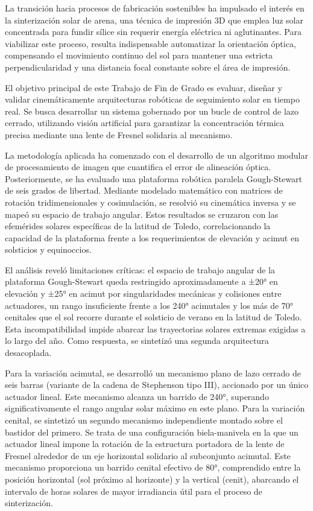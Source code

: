 \begin{resumen}
La transición hacia procesos de fabricación sostenibles ha impulsado el interés en la sinterización solar de arena, una técnica de impresión 3D que emplea luz solar concentrada para fundir sílice sin requerir energía eléctrica ni aglutinantes. Para viabilizar este proceso, resulta indispensable automatizar la orientación óptica, compensando el movimiento continuo del sol para mantener una estricta perpendicularidad y una distancia focal constante sobre el área de impresión.

El objetivo principal de este Trabajo de Fin de Grado es evaluar, diseñar y validar cinemáticamente arquitecturas robóticas de seguimiento solar en tiempo real. Se busca desarrollar un sistema gobernado por un bucle de control de lazo cerrado, utilizando visión artificial para garantizar la concentración térmica precisa mediante una lente de Fresnel solidaria al mecanismo.

La metodología aplicada ha comenzado con el desarrollo de un algoritmo modular de procesamiento de imagen que cuantifica el error de alineación óptica. Posteriormente, se ha evaluado una plataforma robótica paralela Gough-Stewart de seis grados de libertad. Mediante modelado matemático con matrices de rotación tridimensionales y cosimulación, se resolvió su cinemática inversa y se mapeó su espacio de trabajo angular. Estos resultados se cruzaron con las efemérides solares específicas de la latitud de Toledo, correlacionando la capacidad de la plataforma frente a los requerimientos de elevación y acimut en solsticios y equinoccios.

El análisis reveló limitaciones críticas: el espacio de trabajo angular de la plataforma Gough-Stewart queda restringido aproximadamente a ±20° en elevación y ±25° en acimut por singularidades mecánicas y colisiones entre actuadores, un rango insuficiente frente a los 240° acimutales y los más de 70° cenitales que el sol recorre durante el solsticio de verano en la latitud de Toledo. Esta incompatibilidad impide abarcar las trayectorias solares extremas exigidas a lo largo del año. Como respuesta, se sintetizó una segunda arquitectura desacoplada. 

Para la variación acimutal, se desarrolló un mecanismo plano de lazo cerrado de seis barras (variante de la cadena de Stephenson tipo III), accionado por un único actuador lineal. Este mecanismo alcanza un barrido de 240°, superando significativamente el rango angular solar máximo en este plano. Para la variación cenital, se sintetizó un segundo mecanismo independiente montado sobre el bastidor del primero. Se trata de una configuración biela-manivela en la que un actuador lineal impone la rotación de la estructura portadora de la lente de Fresnel alrededor de un eje horizontal solidario al subconjunto acimutal. Este mecanismo proporciona un barrido cenital efectivo de 80°, comprendido entre la posición horizontal (sol próximo al horizonte) y la vertical (cenit), abarcando el intervalo de horas solares de mayor irradiancia útil para el proceso de sinterización.


\end{resumen}
